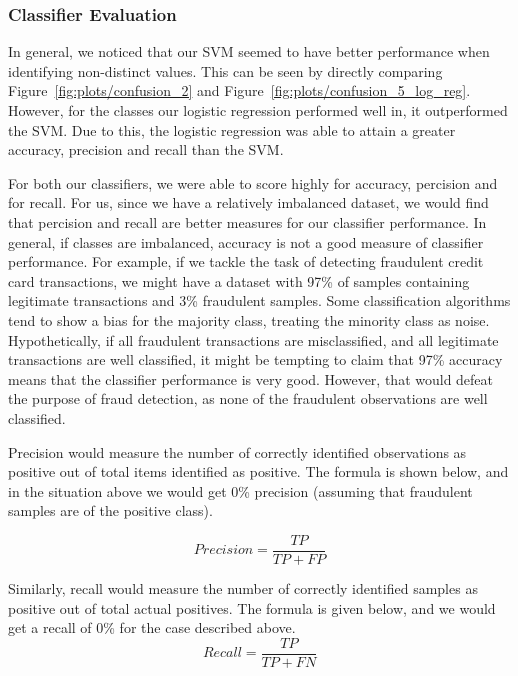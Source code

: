 \documentclass[12pt]{article}
\begin{document}
\subsubsection{Classifier Evaluation}
In general, we noticed that our SVM seemed to have better performance when identifying non-distinct values. This can be seen by directly comparing Figure~\ref{fig:plots/confusion_2} and Figure~\ref{fig:plots/confusion_5_log_reg}. However, for the classes our logistic regression performed well in, it outperformed the SVM. Due to this, the logistic regression was able to attain a greater accuracy, precision and recall than the SVM.


For both our classifiers, we were able to score highly for accuracy, percision and for recall. For us, since we have a relatively imbalanced dataset, we would find that percision and recall are better measures for our classifier performance. In general, if classes are imbalanced, accuracy is not a good measure of classifier performance. For example, if we tackle the task of detecting fraudulent credit card transactions, we might have a dataset with 97\% of samples containing legitimate transactions and 3\% fraudulent samples. Some classification algorithms tend to show a bias for the majority class, treating the minority class as noise. Hypothetically, if all fraudulent transactions are misclassified, and all legitimate transactions are well classified, it might be tempting to claim that 97\% accuracy means that the classifier performance is very good. However, that would defeat the purpose of fraud detection, as none of the fraudulent observations are well classified. 

Precision would measure the number of correctly identified observations as positive out of total items identified as positive. The formula is shown below, and in the situation above we would get 0\% precision (assuming that fraudulent samples are of the positive class).

\begin{equation}
    Precision = \frac{TP}{TP + FP}
\end{equation}

\medskip
\noindent Similarly, recall would measure the number of correctly identified samples as positive out of total actual positives. The formula is given below, and we would get a recall of 0\% for the case described above.
\begin{equation}
    Recall = \frac{TP}{TP + FN}
\end{equation}
\end{document}
